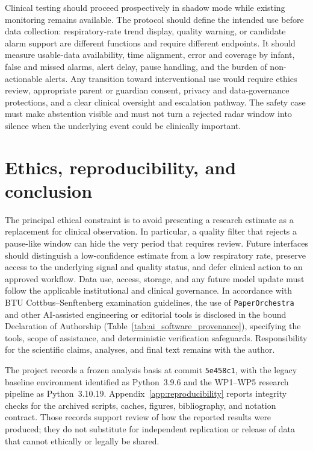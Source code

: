 Clinical testing should proceed prospectively in shadow mode while existing monitoring remains
available. The protocol should define the intended use before data collection: respiratory-rate
trend display, quality warning, or candidate alarm support are different functions and require
different endpoints. It should measure usable-data availability, time alignment, error and
coverage by infant, false and missed alarms, alert delay, pause handling, and the burden of
non-actionable alerts. Any transition toward interventional use would require ethics review,
appropriate parent or guardian consent, privacy and data-governance protections, and a clear
clinical oversight and escalation pathway. The safety case must make abstention visible and must
not turn a rejected radar window into silence when the underlying event could be clinically
important.

\section{Ethics, reproducibility, and conclusion}
\label{sec:ch7_ethics_conclusion}

The principal ethical constraint is to avoid presenting a research estimate as a replacement for
clinical observation. In particular, a quality filter that rejects a pause-like window can hide
the very period that requires review. Future interfaces should distinguish a low-confidence
estimate from a low respiratory rate, preserve access to the underlying signal and quality
status, and defer clinical action to an approved workflow. Data use, access, storage, and any
future model update must follow the applicable institutional and clinical governance. In
accordance with BTU Cottbus--Senftenberg examination guidelines, the use of
\texttt{PaperOrchestra} and other AI-assisted engineering or editorial tools is disclosed in
the bound Declaration of Authorship (Table~\ref{tab:ai_software_provenance}), specifying the
tools, scope of assistance, and deterministic verification safeguards. Responsibility for the
scientific claims, analyses, and final text remains with the author.

The project records a frozen analysis basis at commit \texttt{5e458c1}, with the legacy baseline
environment identified as Python~3.9.6 and the WP1--WP5 research pipeline as Python~3.10.19.
Appendix~\ref{app:reproducibility} reports integrity checks for the archived scripts, caches,
figures, bibliography, and notation contract. Those records support review of how the reported
results were produced; they do not substitute for independent replication or release of data
that cannot ethically or legally be shared.

